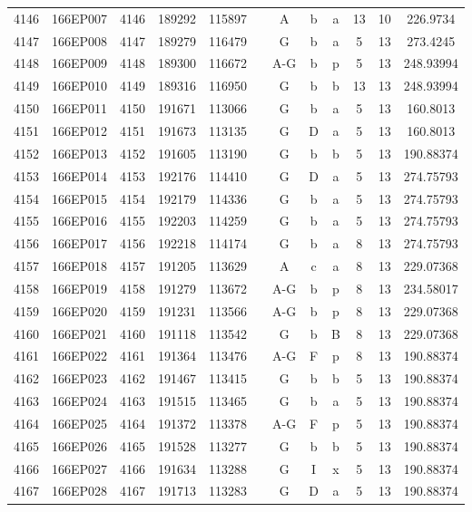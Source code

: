 \begin{tabular}{|*{12}{c|}}
4146 & 166EP007 & 4146 & 189292 & 115897 &  & A & b & a & 13 & 10 & 226.9734 \\ 
4147 & 166EP008 & 4147 & 189279 & 116479 &  & G & b & a & 5 & 13 & 273.4245 \\ 
4148 & 166EP009 & 4148 & 189300 & 116672 &  & A-G & b & p & 5 & 13 & 248.93994 \\ 
4149 & 166EP010 & 4149 & 189316 & 116950 &  & G & b & b & 13 & 13 & 248.93994 \\ 
4150 & 166EP011 & 4150 & 191671 & 113066 &  & G & b & a & 5 & 13 & 160.8013 \\ 
4151 & 166EP012 & 4151 & 191673 & 113135 &  & G & D & a & 5 & 13 & 160.8013 \\ 
4152 & 166EP013 & 4152 & 191605 & 113190 &  & G & b & b & 5 & 13 & 190.88374 \\ 
4153 & 166EP014 & 4153 & 192176 & 114410 &  & G & D & a & 5 & 13 & 274.75793 \\ 
4154 & 166EP015 & 4154 & 192179 & 114336 &  & G & b & a & 5 & 13 & 274.75793 \\ 
4155 & 166EP016 & 4155 & 192203 & 114259 &  & G & b & a & 5 & 13 & 274.75793 \\ 
4156 & 166EP017 & 4156 & 192218 & 114174 &  & G & b & a & 8 & 13 & 274.75793 \\ 
4157 & 166EP018 & 4157 & 191205 & 113629 &  & A & c & a & 8 & 13 & 229.07368 \\ 
4158 & 166EP019 & 4158 & 191279 & 113672 &  & A-G & b & p & 8 & 13 & 234.58017 \\ 
4159 & 166EP020 & 4159 & 191231 & 113566 &  & A-G & b & p & 8 & 13 & 229.07368 \\ 
4160 & 166EP021 & 4160 & 191118 & 113542 &  & G & b & B & 8 & 13 & 229.07368 \\ 
4161 & 166EP022 & 4161 & 191364 & 113476 &  & A-G & F & p & 8 & 13 & 190.88374 \\ 
4162 & 166EP023 & 4162 & 191467 & 113415 &  & G & b & b & 5 & 13 & 190.88374 \\ 
4163 & 166EP024 & 4163 & 191515 & 113465 &  & G & b & a & 5 & 13 & 190.88374 \\ 
4164 & 166EP025 & 4164 & 191372 & 113378 &  & A-G & F & p & 5 & 13 & 190.88374 \\ 
4165 & 166EP026 & 4165 & 191528 & 113277 &  & G & b & b & 5 & 13 & 190.88374 \\ 
4166 & 166EP027 & 4166 & 191634 & 113288 &  & G & I & x & 5 & 13 & 190.88374 \\ 
4167 & 166EP028 & 4167 & 191713 & 113283 &  & G & D & a & 5 & 13 & 190.88374 \\ 

\end{tabular}
